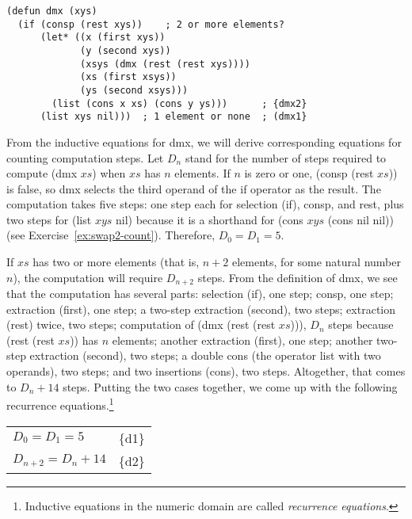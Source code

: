 \label{defun:dmx-copy}
\begin{code}
\begin{verbatim}
(defun dmx (xys)
  (if (consp (rest xys))    ; 2 or more elements?
      (let* ((x (first xys))
             (y (second xys))
             (xsys (dmx (rest (rest xys))))
             (xs (first xsys))
             (ys (second xsys)))
        (list (cons x xs) (cons y ys)))      ; {dmx2}
      (list xys nil)))  ; 1 element or none  ; (dmx1}
\end{verbatim}
\end{code}

From the inductive equations for \textsf{dmx},
we will derive corresponding equations for counting computation steps.
Let $D_n$ stand for the number of steps required
to compute \textsf{(dmx $xs$)} when $xs$ has $n$ elements.
If $n$ is zero or one, \textsf{(consp (rest $xs$))} is false,
so \textsf{dmx} selects the third operand of the \textsf{if}
operator as the result.
The computation takes five steps: one step each for selection (\textsf{if}),
\textsf{consp}, and \textsf{rest},
plus two steps for \textsf{(list $xys$ nil)}
because it is a shorthand for \textsf{(cons $xys$ (cons nil nil))}
(see Exercise~\ref{ex:swap2-count}).
Therefore, $D_0 = D_1 = 5$.

If $xs$ has two or more elements (that is, $n+2$ elements,
for some natural number $n$),
the computation will require $D_{n+2}$ steps.
From the definition of \textsf{dmx}, we see that the computation
has several parts:
selection (\textsf{if}), one step;
\textsf{consp}, one step;
extraction (\textsf{first}), one step;
a two-step extraction (\textsf{second}), two steps;
extraction (\textsf{rest}) twice, two steps;
computation of \textsf{(dmx (rest (rest $xs$)))},
$D_n$ steps because \textsf{(rest (rest $xs$))} has $n$ elements;
another extraction (\textsf{first}), one step;
another two-step extraction (\textsf{second}), two steps;
a double \textsf{cons}
(the operator \textsf{list} with two operands), two steps;
and two insertions (\textsf{cons}), two steps.
Altogether, that comes to $D_n + 14$ steps.
Putting the two cases together,
we come up with the following recurrence equations.\footnote{Inductive
equations in the numeric domain are called
\label{def:recurrence-equations}\emph{recurrence equations}.}\\[-6mm]
\begin{center}
\begin{tabular}{ll}
  $D_0 = D_1 = 5$      & \{d1\} \\
  $D_{n+2} = D_n + 14$ & \{d2\} \\
\end{tabular}
\end{center}

